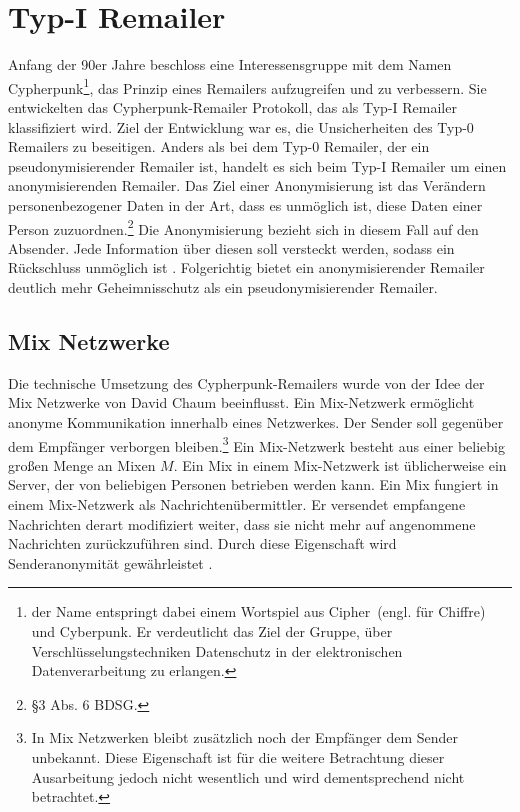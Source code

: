\chapter{Typ-I Remailer}
Anfang der 90er Jahre beschloss eine Interessensgruppe mit dem Namen \glqq Cypherpunk\grqq\footnote{der Name entspringt dabei einem Wortspiel aus \glqq Cipher\grqq ~(engl. für Chiffre) und \glqq Cyberpunk\grqq. Er verdeutlicht das Ziel der Gruppe, über Verschlüsselungstechniken Datenschutz in der elektronischen Datenverarbeitung zu erlangen.}, das Prinzip eines Remailers aufzugreifen und zu verbessern. Sie entwickelten das Cypherpunk-Remailer Protokoll, das als Typ-I Remailer klassifiziert wird. Ziel der Entwicklung war es, die Unsicherheiten des Typ-0 Remailers zu beseitigen.
Anders als bei dem Typ-0 Remailer, der ein pseudonymisierender Remailer ist, handelt es sich beim Typ-I Remailer um einen anonymisierenden Remailer. Das Ziel einer Anonymisierung ist das Verändern personenbezogener Daten in der Art, dass es unmöglich ist, diese Daten einer Person zuzuordnen.\footnote {§3 Abs. 6 BDSG.}
Die Anonymisierung bezieht sich in diesem Fall auf den Absender. Jede Information über diesen soll versteckt werden, sodass ein Rückschluss unmöglich ist \cite[S. 151]{horster2013datenschutz}. Folgerichtig bietet ein anonymisierender Remailer deutlich mehr Geheimnisschutz als ein pseudonymisierender Remailer. 


\section{Mix Netzwerke}
Die technische Umsetzung des Cypherpunk-Remailers wurde von der Idee der Mix Netzwerke von David Chaum beeinflusst. Ein Mix-Netzwerk ermöglicht anonyme Kommunikation innerhalb eines Netzwerkes. Der Sender soll gegenüber dem Empfänger verborgen bleiben.\footnote{In Mix Netzwerken bleibt zusätzlich noch der Empfänger dem Sender unbekannt. Diese Eigenschaft ist für die weitere Betrachtung dieser Ausarbeitung jedoch nicht wesentlich und wird dementsprechend nicht betrachtet.}
Ein Mix-Netzwerk besteht aus einer beliebig großen Menge an Mixen \(M\). Ein Mix in einem Mix-Netzwerk ist üblicherweise ein Server, der von beliebigen Personen betrieben werden kann. Ein Mix fungiert in einem Mix-Netzwerk als Nachrichtenübermittler. Er versendet empfangene Nachrichten derart modifiziert weiter, dass sie nicht mehr auf angenommene Nachrichten zurückzuführen sind. Durch diese Eigenschaft wird Senderanonymität gewährleistet \cite{chaum1981}.

